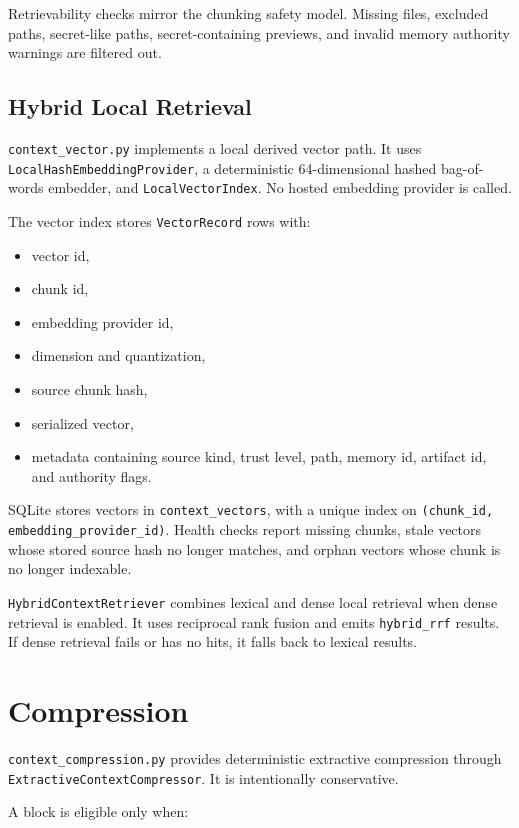 \documentclass[11pt]{article}
\begin{document}
Retrievability checks mirror the chunking safety model. Missing files, excluded paths, secret-like paths, secret-containing previews, and invalid memory authority warnings are filtered out.

\subsection{Hybrid Local Retrieval}

\texttt{context\_vector.py} implements a local derived vector path. It uses \texttt{LocalHashEmbeddingProvider}, a deterministic 64-dimensional hashed bag-of-words embedder, and \texttt{LocalVectorIndex}. No hosted embedding provider is called.

The vector index stores \texttt{VectorRecord} rows with:

\begin{itemize}[leftmargin=*]
  \item vector id,
  \item chunk id,
  \item embedding provider id,
  \item dimension and quantization,
  \item source chunk hash,
  \item serialized vector,
  \item metadata containing source kind, trust level, path, memory id, artifact id, and authority flags.
\end{itemize}

SQLite stores vectors in \texttt{context\_vectors}, with a unique index on \texttt{(chunk\_id, embedding\_provider\_id)}. Health checks report missing chunks, stale vectors whose stored source hash no longer matches, and orphan vectors whose chunk is no longer indexable.

\texttt{HybridContextRetriever} combines lexical and dense local retrieval when dense retrieval is enabled. It uses reciprocal rank fusion and emits \texttt{hybrid\_rrf} results. If dense retrieval fails or has no hits, it falls back to lexical results.

\section{Compression}

\texttt{context\_compression.py} provides deterministic extractive compression through \texttt{ExtractiveContextCompressor}. It is intentionally conservative.

A block is eligible only when:
\end{document}
